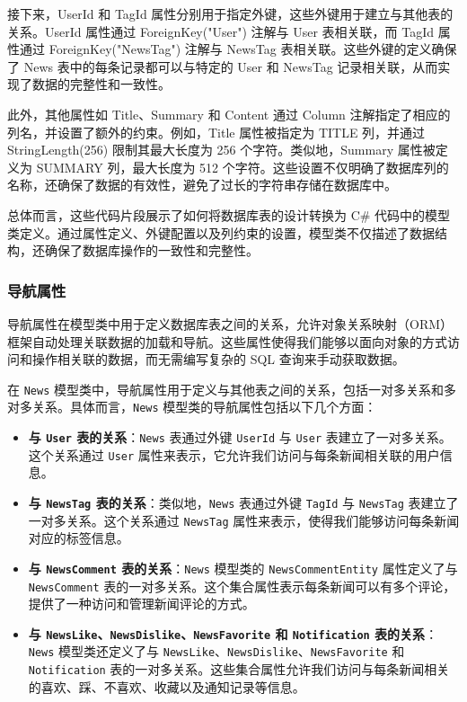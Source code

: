 接下来，UserId 和 TagId 属性分别用于指定外键，这些外键用于建立与其他表的关系。UserId 属性通过 ForeignKey("User") 注解与 User 表相关联，而 TagId 属性通过 ForeignKey("NewsTag") 注解与 NewsTag 表相关联。这些外键的定义确保了 News 表中的每条记录都可以与特定的 User 和 NewsTag 记录相关联，从而实现了数据的完整性和一致性。

此外，其他属性如 Title、Summary 和 Content 通过 Column 注解指定了相应的列名，并设置了额外的约束。例如，Title 属性被指定为 TITLE 列，并通过 StringLength(256) 限制其最大长度为 256 个字符。类似地，Summary 属性被定义为 SUMMARY 列，最大长度为 512 个字符。这些设置不仅明确了数据库列的名称，还确保了数据的有效性，避免了过长的字符串存储在数据库中。

总体而言，这些代码片段展示了如何将数据库表的设计转换为 C\# 代码中的模型类定义。通过属性定义、外键配置以及列约束的设置，模型类不仅描述了数据结构，还确保了数据库操作的一致性和完整性。

\subsubsection{导航属性}

导航属性在模型类中用于定义数据库表之间的关系，允许对象关系映射（ORM）框架自动处理关联数据的加载和导航。这些属性使得我们能够以面向对象的方式访问和操作相关联的数据，而无需编写复杂的 SQL 查询来手动获取数据。

在 \texttt{News} 模型类中，导航属性用于定义与其他表之间的关系，包括一对多关系和多对多关系。具体而言，\texttt{News} 模型类的导航属性包括以下几个方面：

\begin{itemize}
	\item \textbf{与 \texttt{User} 表的关系}：\texttt{News} 表通过外键 \texttt{UserId} 与 \texttt{User} 表建立了一对多关系。这个关系通过 \texttt{User} 属性来表示，它允许我们访问与每条新闻相关联的用户信息。
	
	\item \textbf{与 \texttt{NewsTag} 表的关系}：类似地，\texttt{News} 表通过外键 \texttt{TagId} 与 \texttt{NewsTag} 表建立了一对多关系。这个关系通过 \texttt{NewsTag} 属性来表示，使得我们能够访问每条新闻对应的标签信息。
	
	\item \textbf{与 \texttt{NewsComment} 表的关系}：\texttt{News} 模型类的 \texttt{NewsCommentEntity} 属性定义了与 \texttt{NewsComment} 表的一对多关系。这个集合属性表示每条新闻可以有多个评论，提供了一种访问和管理新闻评论的方式。
	
	\item \textbf{与 \texttt{NewsLike}、\texttt{NewsDislike}、\texttt{NewsFavorite} 和 \texttt{Notification} 表的关系}：\texttt{News} 模型类还定义了与 \texttt{NewsLike}、\texttt{NewsDislike}、\texttt{NewsFavorite} 和 \texttt{Notification} 表的一对多关系。这些集合属性允许我们访问与每条新闻相关的喜欢、踩、不喜欢、收藏以及通知记录等信息。
\end{itemize}

